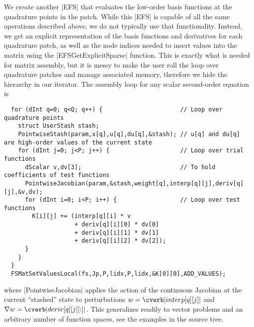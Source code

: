 We create another \cverb|EFS| that evaluates the low-order basis functions at the quadrature points in the patch.
While this \cverb|EFS| is capable of all the same operations described above, we do not typically use that functionality.
Instead, we get an explicit representation of the basis functions and derivatives for each quadrature patch, as well as the node indices needed to insert values into the matrix using the \cverb|EFSGetExplicitSparse| function.
This is exactly what is needed for matrix assembly, but it is messy to make the user roll the loop over quadrature patches and manage associated memory, therefore we hide the hierarchy in our iterator.
The assembly loop for any scalar second-order equation is
\begin{verbatim}
  for (dInt q=0; q<Q; q++) {                      // Loop over quadrature points
    struct UserStash stash;
    PointwiseStash(param,x[q],u[q],du[q],&stash); // u[q] and du[q] are high-order values of the current state
    for (dInt j=0; j<P; j++) {                    // Loop over trial functions
      dScalar v,dv[3];                            // To hold coefficients of test functions
      PointwiseJacobian(param,&stash,weight[q],interp[q][j],deriv[q][j],&v,dv);
      for (dInt i=0; i<P; i++) {                  // Loop over test functions
        K[i][j] += (interp[q][i] * v
                    + deriv[q][i][0] * dv[0]
                    + deriv[q][i][1] * dv[1]
                    + deriv[q][i][2] * dv[2]);
      }
    }
  }
  FSMatSetValuesLocal(fs,Jp,P,lidx,P,lidx,&K[0][0],ADD_VALUES);
\end{verbatim}
where \cverb|PointwiseJacobian| applies the action of the continuous Jacobian at the current ``stashed'' state to perturbations $w = \cverb|interp[q][j]|$ and $\nabla w = \cverb|deriv[q][j][:]|$.
This generalizes readily to vector problems and an arbitrary number of function spaces, see the examples in the {\Dohp} source tree.

